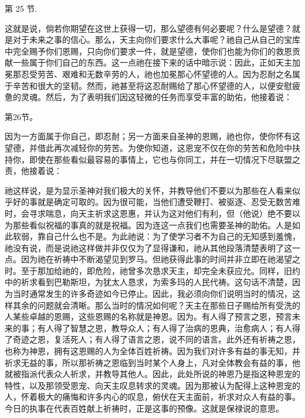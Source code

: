 第 25 节.  \par

这就是说，倘若你期望在这世上获得一切，那么望德有何必要呢？什么是望德？就是对于未来之事的信心。那么，天主向你们要求什么大事呢？祂自己从自己的宝库中完全赐予你们恩赐，只向你们要求一件，就是望德，使你们也能为你们的救恩贡献一些属于你们自己的东西。这一点祂在接下来的话中暗示说：因此，正如天主加冕那忍受劳苦、艰难和无数辛劳的人，祂也加冕那心怀望德的人。因为忍耐之名属于辛苦和很大的坚韧。然而，祂甚至将这忍耐赐给了那心怀望德的人，以便安慰疲惫的灵魂。然后，为了表明我们因这轻微的任务而享受丰富的助佑，他接着说：\par

第26节。\par

因为一方面属于你自己，即忍耐；另一方面来自圣神的恩赐，祂也你，使你怀有这望德，并借此再次减轻你的劳苦。为使你知道，这恩宠不仅在你的劳苦和危险中扶持你，即使在那些看似最容易的事情上，它也与你同工，并在一切情况下尽联盟之责，他接着说：\par

\par

祂这样说，是为显示圣神对我们极大的关怀，并教导他们不要以为那些在人看来似乎好的事就是确定可取的。因为很可能，当他们遭受鞭打、被驱逐、忍受无数苦难时，会寻求喘息，向天主祈求这恩惠，并认为这对他们有利，但（他说）绝不要以为那些看似祝福的事真的就是祝福。因为连这一点我们也需要圣神的助佑。人是如此软弱，靠自己什么也不是。为此祂说：为了使学习者不为自己的无知感到羞愧，祂没有说，而是说祂这样做并非仅仅为了显得谦和，祂从其他段落清楚表明了这一点。因为祂在祈祷中不断渴望见到罗马。但祂获得此事的时间并非立即在祂渴望之时。至于那加给祂的，即危险，祂曾多次恳求天主，却完全未获应允。同样，旧约中的祈求看到巴勒斯坦，为犹太人恳求，为索多玛的人民代祷。这句话不清楚，因为当时通常发生的许多奇迹如今已停止。因此，我必须向你们说明当时的情况，这样其余的问题就会清晰。那么当时的情况如何呢？天主在那些日子赐给所有受洗的人某些卓越的恩赐，这些恩赐的名称就是神恩。因为。有人得了预言之恩，预言未来的事；有人得了智慧之恩，教导众人；有人得了治病的恩典，治愈病人；有人得了奇迹之恩，复活死人；有人得了语言之恩，说不同的语言。此外还有祈祷之恩，也称为神恩，拥有这恩赐的人为全体百姓祈祷。因为我们对许多有益的事无知，并祈求无益的事，所以那祈祷之恩临到当时某个人身上，凡对全体教会有益的事，他就被指派代表众人祈求，并教导其他人。因此，此处所说的神恩乃是指这种恩宠的特性，以及那领受恩宠、向天主叹息转求的灵魂。因为那被认为配得上这种恩宠的人，怀着极大的痛悔和许多内心的叹息，俯伏在天主面前，祈求对众人有益的事。今日的执事在代表百姓献上祈祷时，正是这事的预像。这就是保禄说的意思。\par

